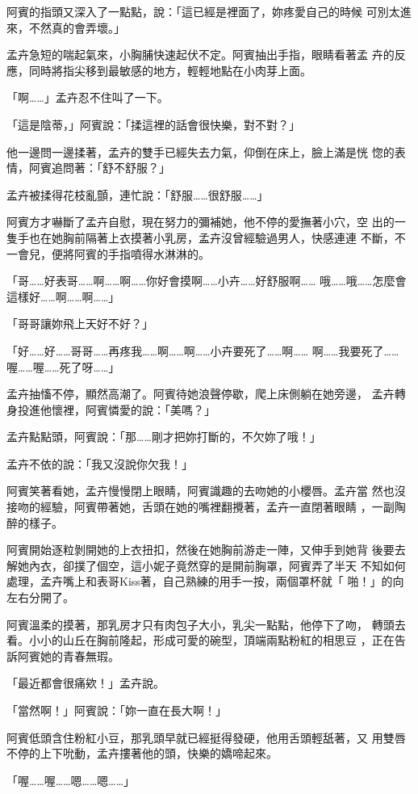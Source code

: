 阿賓的指頭又深入了一點點，說：「這已經是裡面了，妳疼愛自己的時候
可別太進來，不然真的會弄壞。」

孟卉急短的喘起氣來，小胸脯快速起伏不定。阿賓抽出手指，眼睛看著孟
卉的反應，同時將指尖移到最敏感的地方，輕輕地點在小肉芽上面。

「啊……」孟卉忍不住叫了一下。

「這是陰蒂，」阿賓說：「揉這裡的話會很快樂，對不對？」

他一邊問一邊揉著，孟卉的雙手已經失去力氣，仰倒在床上，臉上滿是恍
惚的表情，阿賓追問著：「舒不舒服？」

孟卉被揉得花枝亂顫，連忙說：「舒服……很舒服……」

阿賓方才嚇斷了孟卉自慰，現在努力的彌補她，他不停的愛撫著小穴，空
出的一隻手也在她胸前隔著上衣摸著小乳房，孟卉沒曾經驗過男人，快感連連
不斷，不一會兒，便將阿賓的手指噴得水淋淋的。

「哥……好表哥……啊……啊……你好會摸啊……小卉……好舒服啊……
哦……哦……怎麼會這樣好……啊……啊……」

「哥哥讓妳飛上天好不好？」

「好……好……哥哥……再疼我……啊……啊……小卉要死了……啊……
啊……我要死了……喔……喔……死了呀……」

孟卉抽慉不停，顯然高潮了。阿賓待她浪聲停歇，爬上床側躺在她旁邊，
孟卉轉身投進他懷裡，阿賓憐愛的說：「美嗎？」

孟卉點點頭，阿賓說：「那……剛才把妳打斷的，不欠妳了哦！」

孟卉不依的說：「我又沒說你欠我！」

阿賓笑著看她，孟卉慢慢閉上眼睛，阿賓識趣的去吻她的小櫻唇。孟卉當
然也沒接吻的經驗，阿賓帶著她，舌頭在她的嘴裡翻攪著，孟卉一直閉著眼睛
，一副陶醉的樣子。

阿賓開始逐粒剝開她的上衣扭扣，然後在她胸前游走一陣，又伸手到她背
後要去解她內衣，卻撲了個空，這小妮子竟然穿的是開前胸罩，阿賓弄了半天
不知如何處理，孟卉嘴上和表哥Kiss著，自己熟練的用手一按，兩個罩杯就「
啪！」的向左右分開了。

阿賓溫柔的摸著，那乳房才只有肉包子大小，乳尖一點點，他停下了吻，
轉頭去看。小小的山丘在胸前隆起，形成可愛的碗型，頂端兩點粉紅的相思豆
，正在告訴阿賓她的青春無瑕。

「最近都會很痛欸！」孟卉說。

「當然啊！」阿賓說：「妳一直在長大啊！」

阿賓低頭含住粉紅小豆，那乳頭早就已經挺得發硬，他用舌頭輕舐著，又
用雙唇不停的上下吮動，孟卉摟著他的頭，快樂的嬌啼起來。

「喔……喔……嗯……嗯……」

